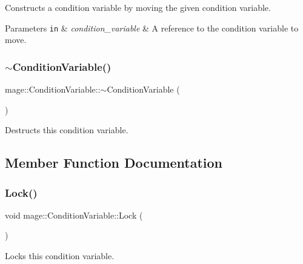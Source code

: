 Constructs a condition variable by moving the given condition variable.


\begin{DoxyParams}[1]{Parameters}
\mbox{\tt in}  & {\em condition\+\_\+variable} & A reference to the condition variable to move. \\
\hline
\end{DoxyParams}
\hypertarget{structmage_1_1_condition_variable_accd5253beb65b2904428afdb889cf00b}{}\label{structmage_1_1_condition_variable_accd5253beb65b2904428afdb889cf00b} 
\subsubsection{\texorpdfstring{$\sim$\+Condition\+Variable()}{~ConditionVariable()}}
{\footnotesize\ttfamily mage\+::\+Condition\+Variable\+::$\sim$\+Condition\+Variable (\begin{DoxyParamCaption}{ }\end{DoxyParamCaption})}

Destructs this condition variable. 

\subsection{Member Function Documentation}
\hypertarget{structmage_1_1_condition_variable_acb0fa4a842b6979ac35c70dab0f43813}{}\label{structmage_1_1_condition_variable_acb0fa4a842b6979ac35c70dab0f43813} 
\subsubsection{\texorpdfstring{Lock()}{Lock()}}
{\footnotesize\ttfamily void mage\+::\+Condition\+Variable\+::\+Lock (\begin{DoxyParamCaption}{ }\end{DoxyParamCaption})}

Locks this condition variable. \hypertarget{structmage_1_1_condition_variable_ac83eae5353cd004ee06fe2376e5bdbf4}{}\label{structmage_1_1_condition_variable_ac83eae5353cd004ee06fe2376e5bdbf4} 
